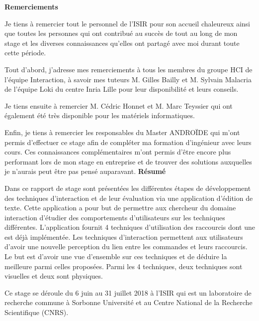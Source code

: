 \documentclass[12pt,a4paper]{article}
\begin{document}
{\huge \textbf{Remerciements}}\\
\vspace{0.5cm}

Je tiens à remercier tout le personnel de l'ISIR pour son accueil
chaleureux ainsi que toutes les personnes qui ont contribué au succès de tout au long de mon stage et les diverses connaissances qu'elles ont partagé avec moi durant toute cette période.
\vspace{0.5cm}

Tout d'abord, j'adresse mes remerciements à tous les membres du groupe HCI de l'équipe Interaction, à savoir mes tuteurs M. Gilles Bailly et M. Sylvain Malacria de l'équipe Loki du centre Inria Lille pour leur disponibilité et leurs conseils.
\vspace{0.5cm}

Je tiens ensuite à remercier M. Cédric Honnet et M. Marc Teyssier qui ont également été très disponible pour les matériels informatiques.
\vspace{0.5cm}

Enfin, je tiens à remercier les responsables du Master ANDROÏDE qui m'ont permis d'effectuer ce stage afin de compléter ma formation d'ingénieur avec leurs cours. Ces connaissances complémentaires m'ont permis d'être encore plus performant lors de mon stage en entreprise et de trouver des
solutions auxquelles je n'aurais peut être pas pensé auparavant.
\newpage
{\huge \textbf{Résumé}}\\
\vspace{0.5cm}

Dans ce rapport de stage sont présentées les différentes étapes de développement des techniques d'interaction et de leur évaluation via une application d'édition de texte. Cette application a pour but de
permettre aux chercheur du domaine interaction d'étudier des comportements d'utilisateurs sur les techniques différentes. L'application fournit 4 techniques d'utilisation des raccourcis dont une est déjà implémentée. Les techniques d'interaction permettent aux utilisateurs d'avoir une nouvelle perception du lien entre les commandes et leurs raccourcis. Le but est d'avoir une vue d'ensemble sur ces techniques et de déduire la meilleure parmi celles proposées. Parmi les 4 techniques, deux techniques sont visuelles et deux sont physiques.

Ce stage se déroule du 6 juin au 31 juillet 2018 à l'ISIR qui est un laboratoire de recherche commune à Sorbonne Université et au Centre National de la Recherche Scientifique (CNRS).
\newpage
\tableofcontents
\newpage
\end{document}
